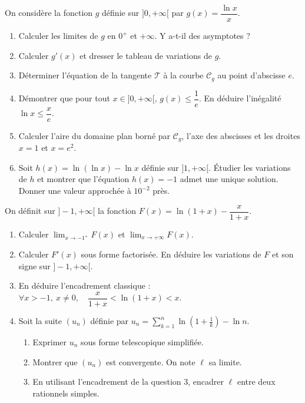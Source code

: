 \documentclass[11pt]{article}
\begin{document}
\begin{exercice}[Étude complète et aire : $g(x) = \dfrac{\ln x}{x}$]
On considère la fonction $g$ définie sur $]0, +\infty[$ par $g(x) = \dfrac{\ln x}{x}$.
\begin{enumerate}
    \item Calculer les limites de $g$ en $0^+$ et $+\infty$. Y a-t-il des asymptotes ?
    \item Calculer $g'(x)$ et dresser le tableau de variations de $g$.
    \item Déterminer l'équation de la tangente $\mathcal{T}$ à la courbe $\mathcal{C}_g$ au point d'abscisse $e$.
    \item Démontrer que pour tout $x \in ]0, +\infty[$, $g(x) \leqslant \dfrac{1}{e}$. En déduire l'inégalité $\ln x \leqslant \dfrac{x}{e}$.
    \item Calculer l'aire du domaine plan borné par $\mathcal{C}_g$, l'axe des abscisses et les droites $x=1$ et $x=e^2$.
    \item Soit $h(x) = \ln(\ln x) - \ln x$ définie sur $]1, +\infty[$. Étudier les variations de $h$ et montrer que l'équation $h(x) = -1$ admet une unique solution. Donner une valeur approchée à $10^{-2}$ près.
\end{enumerate}
\end{exercice}

\begin{exercice}[Inégalités logarithmiques et étude de $F(x) = \ln(1+x) - \dfrac{x}{1+x}$]
On définit sur $]-1, +\infty[$ la fonction $F(x) = \ln(1+x) - \dfrac{x}{1+x}$.
\begin{enumerate}
    \item Calculer $\lim_{x \to -1^+} F(x)$ et $\lim_{x \to +\infty} F(x)$.
    \item Calculer $F'(x)$ sous forme factorisée. En déduire les variations de $F$ et son signe sur $]-1, +\infty[$.
    \item En déduire l'encadrement classique : $\forall x > -1,\ x \neq 0,\quad \dfrac{x}{1+x} < \ln(1+x) < x$.
    \item Soit la suite $(u_n)$ définie par $u_n = \displaystyle\sum_{k=1}^{n} \ln\left(1 + \frac{1}{k}\right) - \ln n$.
        \begin{enumerate}
            \item Exprimer $u_n$ sous forme telescopique simplifiée.
            \item Montrer que $(u_n)$ est convergente. On note $\ell$ sa limite.
            \item En utilisant l'encadrement de la question 3, encadrer $\ell$ entre deux rationnels simples.
        \end{enumerate}
\end{enumerate}
\end{exercice}
\end{document}
